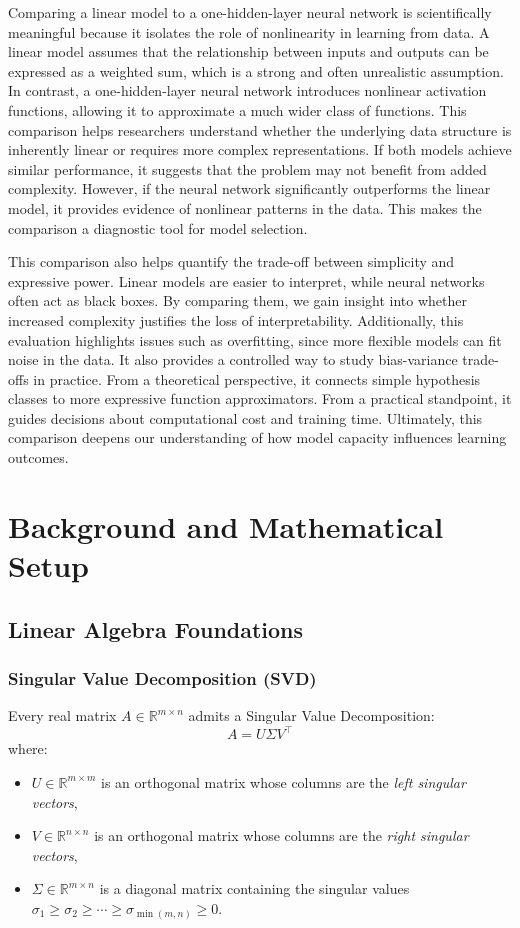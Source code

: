 \documentclass[11pt]{article}
\begin{document}
Comparing a linear model to a one-hidden-layer neural network is scientifically meaningful because it isolates the role of nonlinearity in learning from data. A linear model assumes that the relationship between inputs and outputs can be expressed as a weighted sum, which is a strong and often unrealistic assumption. In contrast, a one-hidden-layer neural network introduces nonlinear activation functions, allowing it to approximate a much wider class of functions. This comparison helps researchers understand whether the underlying data structure is inherently linear or requires more complex representations. If both models achieve similar performance, it suggests that the problem may not benefit from added complexity. However, if the neural network significantly outperforms the linear model, it provides evidence of nonlinear patterns in the data. This makes the comparison a diagnostic tool for model selection.

This comparison also helps quantify the trade-off between simplicity and expressive power. Linear models are easier to interpret, while neural networks often act as black boxes. By comparing them, we gain insight into whether increased complexity justifies the loss of interpretability. Additionally, this evaluation highlights issues such as overfitting, since more flexible models can fit noise in the data. It also provides a controlled way to study bias-variance trade-offs in practice. From a theoretical perspective, it connects simple hypothesis classes to more expressive function approximators. From a practical standpoint, it guides decisions about computational cost and training time. Ultimately, this comparison deepens our understanding of how model capacity influences learning outcomes.


\section{Background and Mathematical Setup}


\subsection{Linear Algebra Foundations}

\subsubsection{Singular Value Decomposition (SVD)}

Every real matrix $A \in \mathbb{R}^{m \times n}$ admits a Singular Value Decomposition:
\[
    A = U \Sigma V^\top
\]
where:
\begin{itemize}[leftmargin=2em]
    \item $U \in \mathbb{R}^{m \times m}$ is an orthogonal matrix whose columns are the \emph{left singular vectors},
    \item $V \in \mathbb{R}^{n \times n}$ is an orthogonal matrix whose columns are the \emph{right singular vectors},
    \item $\Sigma \in \mathbb{R}^{m \times n}$ is a diagonal matrix containing the singular values
          $\sigma_1 \geq \sigma_2 \geq \cdots \geq \sigma_{\min(m,n)} \geq 0$.
\end{itemize}
\end{document}
